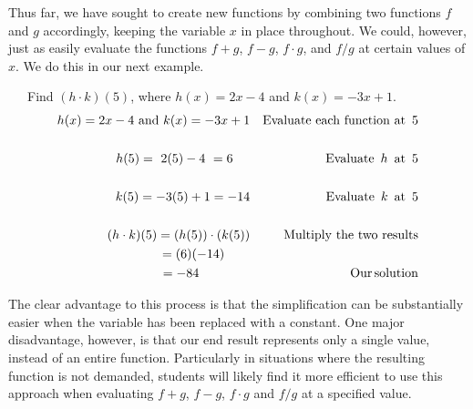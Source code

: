 Thus far, we have sought to create new functions by combining two functions $f$ and $g$ accordingly, keeping the variable $x$ in place throughout.  We could, however, just as easily evaluate the functions $f+g$, $f-g$, $f\cdot g$, and $f/g$ at certain values of $x$.  We do this in our next example.
\begin{example}~~~Find $(h \cdot k) (5)$, where $h (x) = 2 x - 4$ and $k (x) = - 3 x + 1$.
  \begin{eqnarray*}
    h (x) = 2 x - 4 \text{~and~} k (x) = - 3 x + 1  &  & \operatorname{Evaluate~each~function~at~} 5\\
    &  & \\
    h (5) = ~2 (5) - 4~=6~~~~ &  & \operatorname{Evaluate~} h \operatorname{~at~} 5\\
    &  & \\
    k (5) = - 3 (5) + 1=-14 &  & \operatorname{Evaluate~} k \operatorname{~at~} 5\\
    &  & \\
		(h \cdot k) (5)=\left(h (5)\right)\cdot\left(k (5)\right) &  & \operatorname{Multiply~the~two~results}\\
    =(6) (- 14)~~~~~~ &  & \\
    =- 84~~~~~~~~~~~~ &  & \operatorname{Our} \operatorname{solution}
  \end{eqnarray*}
\end{example}

The clear advantage to this process is that the simplification can be substantially easier when the variable has been replaced with a constant.  One major disadvantage, however, is that our end result represents only a single value, instead of an entire function.  Particularly in situations where the resulting function is not demanded, students will likely find it more efficient to use this approach when evaluating $f+g$, $f-g$, $f\cdot g$ and $f/g$ at a specified value.